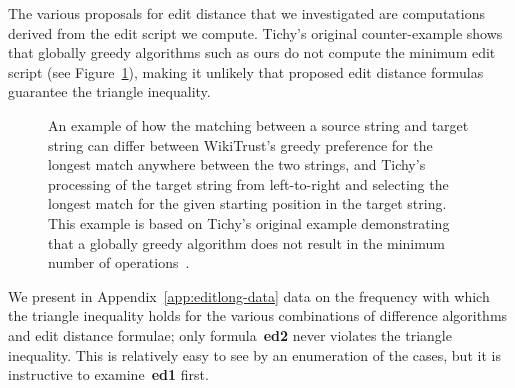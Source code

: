 The various proposals for edit distance that we investigated are
computations derived from the edit script we compute.
Tichy's original counter-example shows that globally greedy algorithms
such as ours do not compute the minimum edit script
(see Figure~\ref{fig:match-comparison}), making it unlikely that
proposed edit distance formulas guarantee the triangle inequality.

\begin{figure}[htbp]
\centering
  \hspace{2ex}
\caption[An example of when WikiTrust and Tichy differ in matching.]{
  An example of how the matching between a source string and target string
  can differ between WikiTrust's greedy preference for the longest match
  anywhere between the two strings, and Tichy's processing of the
  target string from left-to-right and selecting the longest match
  for the given starting position in the target string.
  This example is based on Tichy's original example demonstrating that
  a globally greedy algorithm does not result in the minimum number of
  operations~\cite{Tichy1984}.
}
\label{fig:match-comparison}
\end{figure}

We present in Appendix~\ref{app:editlong-data} data on the frequency
with which the triangle inequality holds for the various combinations
of difference algorithms and edit distance formulae; only formula~\textbf{ed2}
never violates the triangle inequality.
This is relatively easy to see by an enumeration of the cases, but it
is instructive to examine~\textbf{ed1} first.

